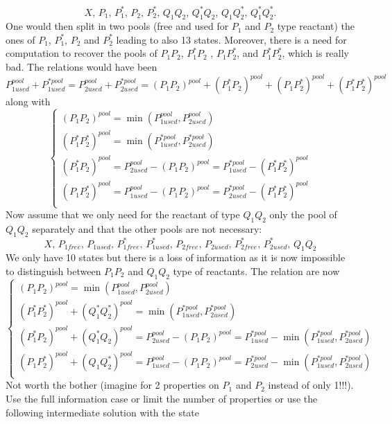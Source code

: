 $$
  X,\,P_1,\,P_1^*,\,P_2,\,P_2^*,\,Q_1Q_2,\,Q_1^*Q_2,\,Q_1Q_2^*,\,Q_1^*Q_2^*.
$$
One would then split in two pools (free and used for $P_1$ and $P_2$ type reactant) the ones of $P_1$, $P_1^*$, $P_2$ and $P_2^*$ leading to also 13 states. Moreover, there is a need for computation to recover the pools of $P_1P_2$, $P_1^*P_2$ , $P_1P_2^*$, and $P_1^*P_2^*$, which is really bad. The relations would have been
$$
  P_{1used}^{pool}+P_{1used}^{*pool} = P_{2used}^{pool}+P_{2used}^{*pool} = (P_1P_2)^{pool}+(P_1^*P_2)^{pool}+(P_1P_2^*)^{pool}+(P_1^*P_2^*)^{pool}
$$
along with
$$
  \left\{
    \begin{array}{l}
      (P_1P_2)^{pool} = \min(P_{1used}^{pool},P_{2used}^{pool}) \\
      (P_1^*P_2^*)^{pool} = \min(P_{1used}^{*pool},P_{2used}^{*pool}) \\
      (P_1^*P_2)^{pool} = P_{2used}^{pool} - (P_1P_2)^{pool} = P_{1used}^{*pool} - (P_1^*P_2^*)^{pool} \\
      (P_1P_2^*)^{pool} = P_{1used}^{pool} - (P_1P_2)^{pool} = P_{2used}^{*pool} - (P_1^*P_2^*)^{pool} \\
    \end{array}
  \right.
$$
Now assume that we only need for the reactant of type $Q_1Q_2$ only the pool of $Q_1Q_2$ separately and that the other pools are not necessary:
$$
  X,\,P_{1free},\,P_{1used},\,P_{1free}^*,\,P_{1used}^*,\,P_{2free},\,P_{2used},\,P_{2free}^*,\,P_{2used}^*,\,Q_1Q_2
$$
We only have 10 states but there is a loss of information as it is now impossible to distinguish between $P_1P_2$ and $Q_1Q_2$ type of reactants. The relation are now
$$
  \left\{
    \begin{array}{l}
      (P_1P_2)^{pool} = \min(P_{1used}^{pool},P_{2used}^{pool}) \\
      (P_1^*P_2^*)^{pool} + (Q_1^*Q_2^*)^{pool} = \min(P_{1used}^{*pool},P_{2used}^{*pool}) \\
      (P_1^*P_2)^{pool} + (Q_1^*Q_2)^{pool} = P_{2used}^{pool} - (P_1P_2)^{pool} = P_{1used}^{*pool} - \min(P_{1used}^{*pool},P_{2used}^{*pool}) \\
      (P_1P_2^*)^{pool} + (Q_1Q_2^*)^{pool} = P_{1used}^{pool} - (P_1P_2)^{pool} = P_{2used}^{*pool} - \min(P_{1used}^{*pool},P_{2used}^{*pool}) \\
    \end{array}
  \right.
$$
Not worth the bother (imagine for 2 properties on $P_1$ and $P_2$ instead of only 1!!!). Use the full information case or limit the number of properties or use the following intermediate solution with the state
